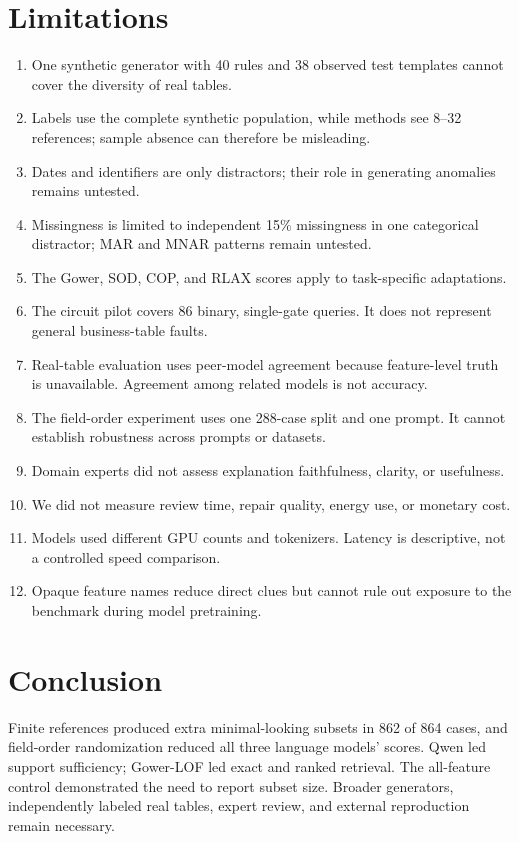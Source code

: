 \documentclass[conference]{IEEEtran}
\begin{document}
\section{Limitations}
\begin{enumerate}
  \item One synthetic generator with 40 rules and 38 observed test templates cannot cover the diversity of real tables.
  \item Labels use the complete synthetic population, while methods see 8--32 references; sample absence can therefore be misleading.
  \item Dates and identifiers are only distractors; their role in generating anomalies remains untested.
  \item Missingness is limited to independent 15\% missingness in one categorical distractor; MAR and MNAR patterns remain untested.
  \item The Gower, SOD, COP, and RLAX scores apply to task-specific adaptations.
  \item The circuit pilot covers 86 binary, single-gate queries. It does not represent general business-table faults.
  \item Real-table evaluation uses peer-model agreement because feature-level truth is unavailable. Agreement among related models is not accuracy.
  \item The field-order experiment uses one 288-case split and one prompt. It cannot establish robustness across prompts or datasets.
  \item Domain experts did not assess explanation faithfulness, clarity, or usefulness.
  \item We did not measure review time, repair quality, energy use, or monetary cost.
  \item Models used different GPU counts and tokenizers. Latency is descriptive, not a controlled speed comparison.
  \item Opaque feature names reduce direct clues but cannot rule out exposure to the benchmark during model pretraining.
\end{enumerate}

\section{Conclusion}
Finite references produced extra minimal-looking subsets in 862 of 864 cases, and field-order randomization reduced all three language models' scores. Qwen led support sufficiency; Gower-LOF led exact and ranked retrieval. The all-feature control demonstrated the need to report subset size. Broader generators, independently labeled real tables, expert review, and external reproduction remain necessary.
\end{document}
